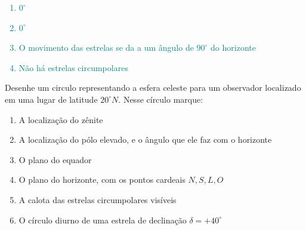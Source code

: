 \begin{sol}
	\textcolor{teal} {
		\begin{enumerate}[label=\alph *)]
			\item $0^{\circ}$
			\item $0^{\circ}$
			\item O movimento das estrelas se da a um ângulo de $90^{\circ}$ do horizonte
			\item Não há estrelas circumpolares
		\end{enumerate}
	}
\end{sol}
\begin{prob}
	Desenhe um circulo representando a esfera celeste para um observador localizado em uma lugar
	de latitude $20^{\circ}N$. Nesse círculo marque:
	\begin{enumerate}[label=\alph *)]
		\item A localização do zênite
		\item A localização do pólo elevado, e o ângulo que ele faz com o horizonte
		\item O plano do equador
		\item O plano do horizonte, com os pontos cardeais $N,S,L,O$
		\item A calota das estrelas circumpolares visíveis
		\item O círculo diurno de uma estrela de declinação $\delta=+40^{\circ}$
	\end{enumerate}
\end{prob}
\newpage
